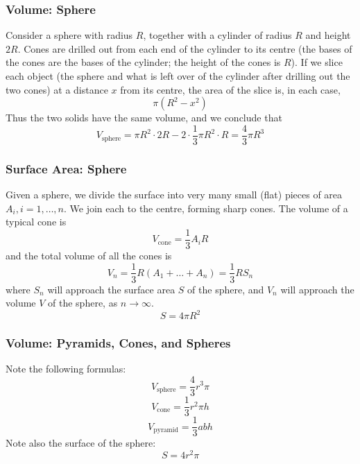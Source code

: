 \documentclass[xcolor=dvipsnames]{beamer}
\begin{document}
\begin{frame}
  \frametitle{Volume: Sphere}
  Consider a sphere with radius $R$, together with a cylinder of
  radius $R$ and height $2R$. Cones are drilled out from each end of
  the cylinder to its centre (the bases of the cones are the bases of
  the cylinder; the height of the cones is $R$). If we slice each
  object (the sphere and what is left over of the cylinder after
  drilling out the two cones) at a distance $x$ from its centre, the
  area of the slice is, in each case,
  \begin{equation}
    \label{eq:yahgooli}
    \pi(R^{2}-x^{2})
  \end{equation}
  Thus the two solids have the same volume, and we conclude that
  \begin{equation}
    \label{eq:aengiegu}
    V_{\mbox{sphere}}=\pi{}R^{2}\cdot{}2R-2\cdot\frac{1}{3}\pi{}R^{2}\cdot{}R=\frac{4}{3}\pi{}R^{3}
  \end{equation}
\end{frame}

\begin{frame}
  \frametitle{Surface Area: Sphere}
  Given a sphere, we divide the surface into very many small (flat)
  pieces of area $A_{i},i=1,{\ldots},n$. We join each to the centre,
  forming sharp cones. The volume of a typical cone is
  \begin{equation}
    \label{eq:bejohjoy}
    V_{\mbox{cone}}=\frac{1}{3}A_{i}R
  \end{equation}
  and the total volume of all the cones is
  \begin{equation}
    \label{eq:ohgaghae}
    V_{n}=\frac{1}{3}R(A_{1}+{\ldots}+A_{n})=\frac{1}{3}RS_{n}
  \end{equation}
where $S_{n}$ will approach the surface area $S$ of the sphere, and $V_{n}$
will approach the volume $V$ of the sphere, as $n\rightarrow\infty$.
\begin{equation}
  \label{eq:aeheegae}
  S=4\pi{}R^{2}
\end{equation}
\end{frame}

\begin{frame}
  \frametitle{Volume: Pyramids, Cones, and Spheres}
Note the following formulas:
\begin{equation}
  \label{eq:joyakuap}
  V_{\mbox{sphere}}=\frac{4}{3}r^{3}\pi
\end{equation}
\begin{equation}
  \label{eq:ahquieye}
  V_{\mbox{cone}}=\frac{1}{3}r^{2}\pi{}h
\end{equation}
\begin{equation}
  \label{eq:kooshogu}
  V_{\mbox{pyramid}}=\frac{1}{3}abh
\end{equation}
Note also the surface of the sphere:
\begin{equation}
  \label{eq:aighaing}
  S=4r^{2}\pi
\end{equation}
\end{frame}
\end{document}
